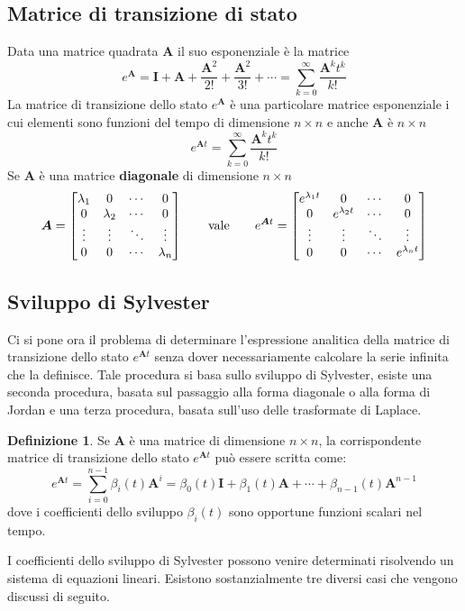 \documentclass[a4paper]{article}
\renewcommand{\vec}{\bm}
\theoremstyle{definition}
\newtheorem{defn}{Definizione}[subsection]
\begin{document}
		\subsection{Matrice di transizione di stato}
			Data una matrice quadrata $ \vec{A} $ il suo esponenziale è la matrice
			\[
				e^{\vec{A}} = \vec{I} + \vec{A} + \dfrac{\vec{A}^2}{2!} + \dfrac{\vec{A}^2}{3!} + \cdots =
				\sum_{k = 0}^{\infty} \dfrac{\vec{A}^k t^k}{k!}
			\]
			La matrice di transizione dello stato $ e^{\vec{A}} $ è una particolare matrice esponenziale i cui elementi sono funzioni del tempo di dimensione $ n\times n $ e anche $ \vec{A} $ è $ n\times n $
			\[
				e^{\vec{A}t} = \sum_{k=0}^{\infty} \dfrac{\vec{A}^k t^k}{k!}
			\]
			Se $ \vec{A} $ è una matrice \textbf{diagonale} di dimensione $ n\times n $
			\[
				\vec{A} = 
				\begin{bmatrix}
					\lambda_1 & 0 & \cdots & 0 \\
					0 & \lambda_2 & \cdots & 0 \\
					\vdots & \vdots & \ddots & \vdots \\
					0 & 0 & \cdots & \lambda_n 
				\end{bmatrix}
				\qquad
				\textup{vale}
				\qquad
				e^{\vec{A}t} =
				\begin{bmatrix}
					e^{\lambda_1 t} & 0 & \cdots & 0 \\
					0 & e^{\lambda_2 t} & \cdots & 0 \\
					\vdots & \vdots & \ddots & \vdots \\
					0 & 0 & \cdots & e^{\lambda_n t}
				\end{bmatrix}
			\]
			
			
		\subsection{Sviluppo di Sylvester}
			Ci si pone ora il problema di determinare l'espressione analitica della matrice di transizione dello stato $ e^{\vec{A}t} $ senza dover necessariamente calcolare la serie infinita che la
			definisce. Tale procedura si basa sullo sviluppo di Sylvester, esiste una seconda procedura, basata sul passaggio alla forma diagonale o alla forma di Jordan e una terza procedura, basata sull'uso delle
			trasformate di Laplace.
			
			\begin{defn}
				Se $ \vec{A} $ è una matrice di dimensione $ n\times n $, la corrispondente matrice di transizione dello stato $ e^{\vec{A}t} $ può essere scritta come:
				\[
					e^{\vec{A}t} = \sum_{i = 0}^{n - 1} \beta_i (t)\vec{A}^i = 
					\beta_0 (t)\vec{I} + \beta_1(t)\vec{A} + \cdots + \beta_{n-1}(t)\vec{A}^{n-1}
				\]
				dove i coefficienti dello sviluppo $ \beta_i(t) $ sono opportune funzioni scalari nel tempo.			
			\end{defn}
			I coefficienti dello sviluppo di Sylvester possono venire determinati risolvendo un
			sistema di equazioni lineari. Esistono sostanzialmente tre diversi casi che vengono discussi di seguito.
			
\end{document}
